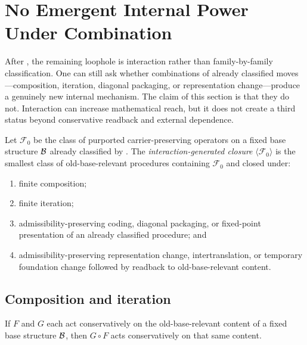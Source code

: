 \section{No Emergent Internal Power Under Combination}\label{sec:no-emergence}

After , the remaining loophole is interaction rather than family-by-family classification. One can still ask whether combinations of already classified moves---composition, iteration, diagonal packaging, or representation change---produce a genuinely new internal mechanism. The claim of this section is that they do not. Interaction can increase mathematical reach, but it does not create a third status beyond conservative readback and external dependence.

\begin{definition}\label{def:interaction-closure}
Let $\mathcal{F}_0$ be the class of purported carrier-preserving operators on a fixed base structure $\mathcal{B}$ already classified by . The \emph{interaction-generated closure} $\langle \mathcal{F}_0\rangle$ is the smallest class of old-base-relevant procedures containing $\mathcal{F}_0$ and closed under:
\begin{enumerate}[label=(\roman*)]
    \item finite composition;
    \item finite iteration;
    \item admissibility-preserving coding, diagonal packaging, or fixed-point presentation of an already classified procedure; and
    \item admissibility-preserving representation change, intertranslation, or temporary foundation change followed by readback to old-base-relevant content.
\end{enumerate}
\end{definition}

\subsection{Composition and iteration}

\begin{lemma}\label{lem:cons-composition}
If $F$ and $G$ each act conservatively on the old-base-relevant content of a fixed base structure $\mathcal{B}$, then $G\circ F$ acts conservatively on that same content.
\end{lemma}

